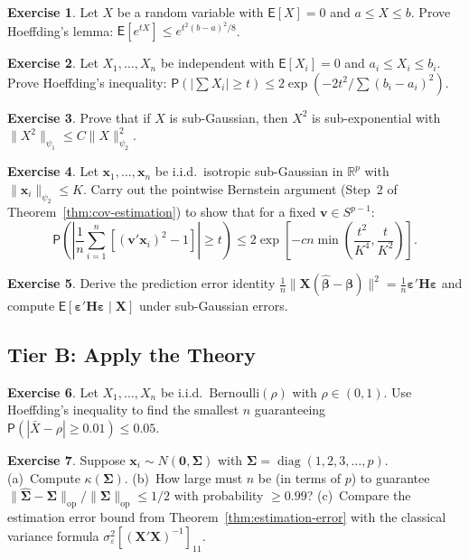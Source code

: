 \documentclass[12pt,a4paper]{article}
\theoremstyle{definition}
\newtheorem{exercise}{Exercise}[section]
\newcommand\expc{\mathsf{E}}
\newcommand\prb{\mathsf{P}}
\DeclareMathOperator\diag{diag}
\newcommand{\bX}{\mathbf{X}}
\newcommand{\bx}{\mathbf{x}}
\def\bb{\boldsymbol{\beta}}
\newcommand{\be}{\boldsymbol{\varepsilon}}
\newcommand{\bH}{\mathbf{H}}
\newcommand{\bzero}{\mathbf{0}}
\newcommand{\bv}{\mathbf{v}}
\newcommand{\Real}{\mathbb{R}}
\newcommand{\bSigma}{\boldsymbol{\Sigma}}
\newcommand{\hbSigma}{\hat{\boldsymbol{\Sigma}}}
\newcommand{\hbb}{\hat{\boldsymbol{\beta}}}
\newcommand{\opnorm}[1]{\|#1\|_{\mathrm{op}}}
\begin{document}
\begin{exercise}\label{ex:mA1}
Let $X$ be a random variable with $\expc[X] = 0$ and $a \leqslant X \leqslant b$. Prove Hoeffding's lemma: $\expc[e^{tX}] \leqslant e^{t^2(b-a)^2/8}$.
\end{exercise}

\begin{exercise}\label{ex:mA2}
Let $X_1, \ldots, X_n$ be independent with $\expc[X_i] = 0$ and $a_i \leqslant X_i \leqslant b_i$. Prove Hoeffding's inequality: $\prb(|\sum X_i| \geqslant t) \leqslant 2\exp(-2t^2/\sum(b_i - a_i)^2)$.
\end{exercise}

\begin{exercise}\label{ex:mA3}
Prove that if $X$ is sub-Gaussian, then $X^2$ is sub-exponential with $\|X^2\|_{\psi_1} \leqslant C\|X\|_{\psi_2}^2$.
\end{exercise}

\begin{exercise}\label{ex:mA4}
Let $\bx_1, \ldots, \bx_n$ be i.i.d.\ isotropic sub-Gaussian in $\Real^p$ with $\|\bx_i\|_{\psi_2} \leqslant K$. Carry out the pointwise Bernstein argument (Step~2 of Theorem~\ref{thm:cov-estimation}) to show that for a fixed $\bv \in S^{p-1}$:
\[
\prb\!\left(\left|\frac{1}{n}\sum_{i=1}^n [(\bv'\bx_i)^2 - 1]\right| \geqslant t\right) \leqslant 2\exp\!\left[-cn\min\!\left(\frac{t^2}{K^4}, \frac{t}{K^2}\right)\right].
\]
\end{exercise}

\begin{exercise}\label{ex:mA5}
Derive the prediction error identity $\frac{1}{n}\|\bX(\hbb - \bb)\|^2 = \frac{1}{n}\be'\bH\be$ and compute $\expc[\be'\bH\be \mid \bX]$ under sub-Gaussian errors.
\end{exercise}

\subsection*{Tier B: Apply the Theory}

\begin{exercise}\label{ex:mB1}
Let $X_1, \ldots, X_n$ be i.i.d.\ $\mathrm{Bernoulli}(\rho)$ with $\rho \in (0,1)$. Use Hoeffding's inequality to find the smallest $n$ guaranteeing $\prb(|\bar{X} - \rho| \geqslant 0.01) \leqslant 0.05$.
\end{exercise}

\begin{exercise}\label{ex:mB2}
Suppose $\bx_i \sim N(\bzero, \bSigma)$ with $\bSigma = \diag(1, 2, 3, \ldots, p)$. (a)~Compute $\kappa(\bSigma)$. (b)~How large must $n$ be (in terms of $p$) to guarantee $\opnorm{\hbSigma - \bSigma}/\opnorm{\bSigma} \leqslant 1/2$ with probability $\geqslant 0.99$? (c)~Compare the estimation error bound from Theorem~\ref{thm:estimation-error} with the classical variance formula $\sigma_\varepsilon^2[(\bX'\bX)^{-1}]_{11}$.
\end{exercise}
\end{document}
